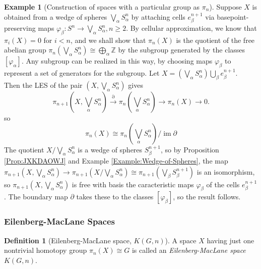 \documentclass[reqno]{amsart}
\theoremstyle{definition}
\newtheorem{definition}[theorem]{Definition}
\newtheorem{example}[theorem]{Example}
\theoremstyle{remark}
\DeclareMathOperator{\im}{im}
\begin{document}
\begin{example}[Construction of spaces
    with a particular group as $\pi_n$]\label{Example:DJISI02}
    Suppose $X$ is obtained from a wedge of
    spheres $\bigvee_{\alpha} S_{\alpha}^{n}$ by
    attaching cells $e_{\beta}^{n+1}$ via
    basepoint-preserving maps
    $\varphi_{\beta} \colon S^{n} \to 
    \bigvee_{\alpha} S_{\alpha}^{n}, n\ge 2$.
    By cellular approximation, we know that
    $\pi_i (X) = 0$ for $i < n$, and we shall show
    that $\pi_n(X)$ is the quotient of the free
    abelian group
    $\pi_n \left( \bigvee_{\alpha} S_{\alpha}^{n} \right) 
    \cong \bigoplus_{\alpha} \mathbb{Z}$ by
    the subgroup generated by the
    classes $\left[ \varphi_{\alpha} \right] $.
    Any subgroup can be realized in this way, by
    choosing maps $\varphi_{\beta}$ to represent a 
    set of generators for the subgroup.
    Let 
    $X = \left( \bigvee_{\alpha}S_{\alpha}^{n} \right) 
    \bigcup_{\beta } e_{\beta}^{n+1}$.\\
    Then the LES of the pair
    $\left( X, \bigvee_{\alpha} S_{\alpha}^{n} \right) $ gives
    \[
    \pi_{n+1}\left( X, \bigvee_{\alpha}S_{\alpha}^{n} \right) 
    \stackrel{\partial}{\to} \pi_n \left( \bigvee_{\alpha}
    S_{\alpha}^{n} \right) \to 
    \pi_n (X) \to 0.
    \] 
    so 
    \[
    \pi_n (X) \cong \pi_n \left( \bigvee_{\alpha}S_{\alpha}^{n}
    \right) / \im \partial
    \] 
    The quotient
    $X / \bigvee_{\alpha} S_{\alpha}^{n}$ is a wedge
    of spheres $S_{\beta}^{n+1}$, so by Proposition
    \ref{Prop:JXKDAOWJ} and Example \ref{Example:Wedge-of-Spheres},
    the map
     $\pi_{n+1} \left( X, \bigvee_{\alpha}S_{\alpha}^{n} \right) 
     \to \pi_{n+1} \left( X / \bigvee_{\alpha}S_{\alpha}^{n} \right) 
     \cong \pi_{n+1} \left( \bigvee_{\beta}
     S_{\beta}^{n+1} \right) $ 
     is an isomorphism, so
     $\pi_{n+1}\left( X, \bigvee_{\alpha}S_{\alpha}^{n} \right) $ 
     is free with basis the caracteristic
     maps $\varphi_{\beta}$ of the cells $e_{\beta}^{n+1}$.
     The boundary map $\partial$ takes
     these to the classes
     $\left[ \varphi_{\beta} \right] $, so
     the result follows.

\end{example}


\newpage

\subsubsection{Eilenberg-MacLane Spaces}

\begin{definition}[Eilenberg-MacLane space, $K (G,n)$]
    A space $X$ having just one nontrivial homotopy
    group $\pi_n (X) \cong G$ is called
    an \textit{Eilenberg-MacLane space} $K(G,n)$. 
\end{definition}
\end{document}
